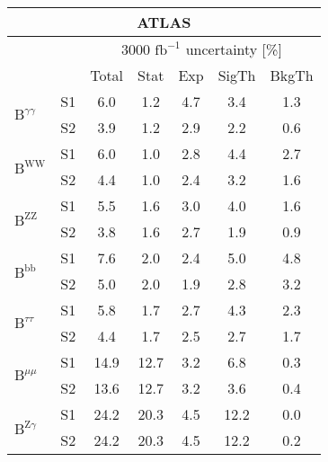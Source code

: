 \begin{tabular}{@{} l c c@{\hskip 0.15in} c c c c @{}}
  \hline
   \multicolumn{7}{c}{ATLAS}\\
 \hline  
  &  & \multicolumn{5}{c}{3000 $\text{fb}^{-1}$ uncertainty [\%]} \\
  &  & Total & Stat & Exp & SigTh & BkgTh \\
  \hline
  \multirow{2}{*}{$\mathrm{B}^{\gamma\gamma}$} & S1 &6.0   & 1.2   & 4.7   & 3.4   & 1.3  \\[1pt] 
  & S2  &3.9   & 1.2   & 2.9   & 2.2   & 0.6  \\[4pt]
  \multirow{2}{*}{$\mathrm{B}^{\mathrm{WW}}$} & S1 &6.0   & 1.0   & 2.8   & 4.4   & 2.7  \\[1pt]
  & S2 &4.4   & 1.0   & 2.4   & 3.2   & 1.6  \\[4pt]
  \multirow{2}{*}{$\mathrm{B}^{\mathrm{ZZ}}$} & S1 &5.5   & 1.6   & 3.0   & 4.0   & 1.6  \\[1pt]
  & S2 &3.8   & 1.6   & 2.7   & 1.9   & 0.9  \\[4pt]
  \multirow{2}{*}{$\mathrm{B}^{\mathrm{bb}}$} & S1 &7.6   & 2.0   & 2.4   & 5.0   & 4.8  \\[1pt]
  & S2 &5.0   & 2.0   & 1.9   & 2.8   & 3.2  \\[4pt]
  \multirow{2}{*}{$\mathrm{B}^{\tau\tau }$} & S1 &5.8   & 1.7   & 2.7   & 4.3   & 2.3  \\[1pt]
  & S2 &4.4   & 1.7   & 2.5   & 2.7   & 1.7  \\[4pt]
  \multirow{2}{*}{$\mathrm{B}^{\mu\mu}$} & S1 &14.9  & 12.7  & 3.2   & 6.8   & 0.3  \\[1pt]
  & S2 &13.6  & 12.7  & 3.2   & 3.6   & 0.4  \\[4pt]
  \multirow{2}{*}{$\mathrm{B}^{\mathrm{Z}\gamma}$} & S1 &24.2  & 20.3  & 4.5   & 12.2  & 0.0  \\[1pt]
  & S2 &24.2  & 20.3  & 4.5   & 12.2  & 0.2  \\[4pt]
  \hline
\end{tabular}
